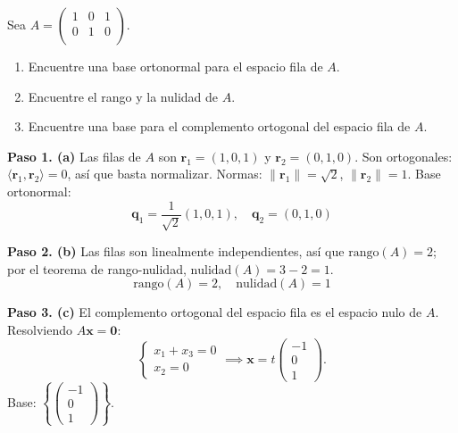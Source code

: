 \begin{prob}
Sea $A=\left( \begin{array}{ccc} 
	1&0&1\\
	0&1&0\\
	\end{array} \right).$ 
	
	\begin{enumerate} 
	\item Encuentre una base ortonormal para el espacio fila de $A.$
	\item Encuentre el rango y la nulidad de $A.$
    \item Encuentre una base para el complemento ortogonal del espacio fila de $A.$
	\end{enumerate}	
\begin{myproof}
\textbf{Paso 1. (a)} Las filas de \( A \) son \( \mathbf{r}_1 = (1,0,1) \) y \( \mathbf{r}_2 = (0,1,0) \). Son ortogonales: \( \langle \mathbf{r}_1, \mathbf{r}_2 \rangle = 0 \), así que basta normalizar. Normas: \( \|\mathbf{r}_1\| = \sqrt{2} \), \( \|\mathbf{r}_2\| = 1 \). Base ortonormal:
\[
\boxed{\mathbf{q}_1 = \frac{1}{\sqrt{2}} (1, 0, 1), \quad \mathbf{q}_2 = (0, 1, 0)}
\]

\textbf{Paso 2. (b)} Las filas son linealmente independientes, así que \( \text{rango}(A) = 2 \); por el teorema de rango-nulidad, \( \text{nulidad}(A) = 3 - 2 = 1 \).
\[
\boxed{\text{rango}(A) = 2, \quad \text{nulidad}(A) = 1}
\]

\textbf{Paso 3. (c)} El complemento ortogonal del espacio fila es el espacio nulo de \( A \). Resolviendo \( A\mathbf{x} = \mathbf{0} \):
\[
\begin{cases}
x_1 + x_3 = 0 \\
x_2 = 0
\end{cases} \implies \mathbf{x} = t \begin{pmatrix} -1 \\ 0 \\ 1 \end{pmatrix}.
\]
Base: \( \boxed{\left\{ \begin{pmatrix} -1 \\ 0 \\ 1 \end{pmatrix} \right\}} \).
\end{myproof}
\end{prob}

